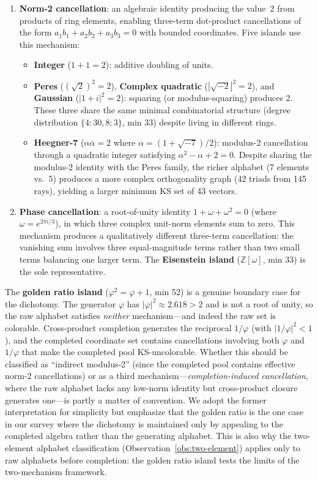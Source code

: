 \documentclass[12pt,a4paper]{article}
\newcommand{\Z}{\mathbb{Z}}
\begin{document}
\begin{enumerate}
    \item[\textbf{(A)}] \textbf{Norm-2 cancellation}: an algebraic identity producing the value~2 from products of ring elements, enabling three-term dot-product cancellations of the form $a_1 b_1 + a_2 b_2 + a_3 b_3 = 0$ with bounded coordinates. Five islands use this mechanism:
    \begin{itemize}
        \item \textbf{Integer} ($1 + 1 = 2$): additive doubling of units.
        \item \textbf{Peres} ($(\sqrt{2})^2 = 2$), \textbf{Complex quadratic} ($|\sqrt{-2}|^2 = 2$), and \textbf{Gaussian} ($|1+i|^2 = 2$): squaring (or modulus-squaring) produces 2. These three share the same minimal combinatorial structure (degree distribution $\{4{:}30, 8{:}3\}$, min 33) despite living in different rings.
        \item \textbf{Heegner-7} ($\alpha\bar\alpha = 2$ where $\alpha = (1+\sqrt{-7})/2$): modulus-2 cancellation through a quadratic integer satisfying $\alpha^2 - \alpha + 2 = 0$. Despite sharing the modulus-2 identity with the Peres family, the richer alphabet (7 elements vs.\ 5) produces a more complex orthogonality graph (42 triads from 145 rays), yielding a larger minimum KS set of 43 vectors.
    \end{itemize}
    \item[\textbf{(B)}] \textbf{Phase cancellation}: a root-of-unity identity $1 + \omega + \omega^2 = 0$ (where $\omega = e^{2\pi i/3}$), in which three complex unit-norm elements sum to zero. This mechanism produces a qualitatively different three-term cancellation: the vanishing sum involves three equal-magnitude terms rather than two small terms balancing one larger term. The \textbf{Eisenstein island} ($\Z[\omega]$, min 33) is the sole representative.
\end{enumerate}

The \textbf{golden ratio island} ($\varphi^2 = \varphi + 1$, min 52) is a genuine boundary case for the dichotomy. The generator $\varphi$ has $|\varphi|^2 \approx 2.618 > 2$ and is not a root of unity, so the raw alphabet satisfies \emph{neither} mechanism---and indeed the raw set is colorable.  Cross-product completion generates the reciprocal $1/\varphi$ (with $|1/\varphi|^2 < 1$), and the completed coordinate set contains cancellations involving both $\varphi$ and $1/\varphi$ that make the completed pool KS-uncolorable.  Whether this should be classified as ``indirect modulus-2'' (since the completed pool contains effective norm-2 cancellations) or as a third mechanism---\emph{completion-induced cancellation}, where the raw alphabet lacks any low-norm identity but cross-product closure generates one---is partly a matter of convention.  We adopt the former interpretation for simplicity but emphasize that the golden ratio is the one case in our survey where the dichotomy is maintained only by appealing to the completed algebra rather than the generating alphabet.  This is also why the two-element alphabet classification (Observation~\ref{obs:two-element}) applies only to raw alphabets before completion: the golden ratio island tests the limits of the two-mechanism framework.
\end{document}

